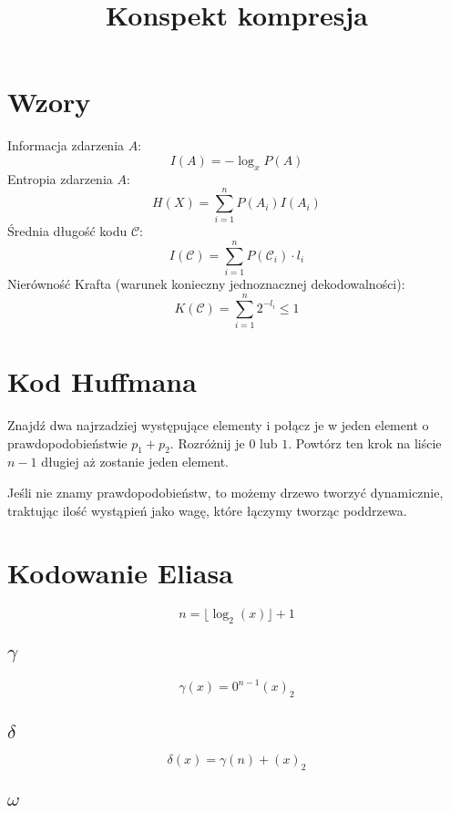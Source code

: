 \documentclass{../notatki}
\title{Konspekt kompresja}
\begin{document}
\begin{multicols}{2}

  \section{Wzory}

  Informacja zdarzenia $A$:
  $$
  I(A) = -\log_xP(A)
  $$
  Entropia zdarzenia $A$:
  $$
  H(X) = \sum_{i=1}^{n}P(A_i)I(A_i)
  $$
  Średnia długość kodu $\mathcal{C}$:
  $$
  I(\mathcal{C}) = \sum_{i=1}^{n}P(\mathcal{C}_i) \cdot l_i
  $$
  Nierówność Krafta (warunek konieczny jednoznacznej dekodowalności):
  $$
  K(\mathcal{C}) = \sum_{i=1}^{n}2^{-l_i} \leq 1
  $$

  \section{Kod Huffmana}

  Znajdź dwa najrzadziej występujące elementy i połącz je w jeden element
  o prawdopodobieństwie $p_1 + p_2$. Rozróżnij je $0$ lub $1$. Powtórz
  ten krok na liście $n-1$ długiej aż zostanie jeden element.

  Jeśli nie znamy prawdopodobieństw, to możemy drzewo tworzyć
  dynamicznie, traktując
  ilość wystąpień jako wagę, które łączymy tworząc poddrzewa.

  \section{Kodowanie Eliasa}

  $$
  n = \lfloor \log_2(x) \rfloor + 1
  $$

  \subsection{\texorpdfstring{$\gamma$}{Gamma}}

  $$
  \gamma(x) = 0^{n-1}(x)_2
  $$

  \subsection{\texorpdfstring{$\delta$}{Delta}}

  $$
  \delta(x) = \gamma(n) + (x)_2
  $$

  \subsection{\texorpdfstring{$\omega$}{Omega}}


\end{multicols}
\end{document}
